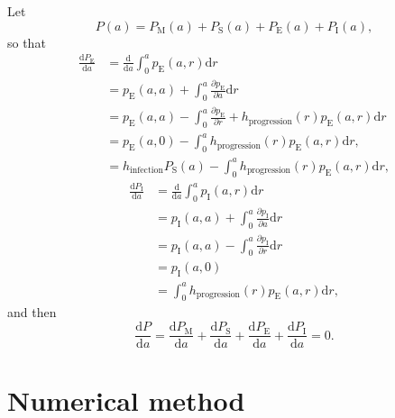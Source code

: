 \documentclass[12pt]{article}
\newcommand{\md}{\mathrm{d}}
\begin{document}
Let
\begin{equation}
  P(a) = P_{\mathrm{M}}(a) + P_{\mathrm{S}}(a)
  + P_{\mathrm{E}}(a) + P_{\mathrm{I}}(a),
\end{equation}
so that
\begin{equation}
  \begin{split}
    \frac{\md P_{\mathrm{E}}}{\md a}
    &= \frac{\md}{\md a}  \int_0^a p_{\mathrm{E}}(a, r) \md r
    \\
    &= p_{\mathrm{E}}(a, a)
    + \int_0^a \frac{\partial p_{\mathrm{E}}}{\partial a} \md r
    \\
    &= p_{\mathrm{E}}(a, a)
    - \int_0^a \frac{\partial p_{\mathrm{E}}}{\partial r}
    + h_{\mathrm{progression}}(r) p_{\mathrm{E}}(a, r) \md r
    \\
    &= p_{\mathrm{E}}(a, 0)
    - \int_0^a h_{\mathrm{progression}}(r) p_{\mathrm{E}}(a, r) \md r,
    \\
    &= h_{\mathrm{infection}} P_{\mathrm{S}}(a)
    - \int_0^a h_{\mathrm{progression}}(r) p_{\mathrm{E}}(a, r) \md r,
  \end{split}
\end{equation}
\begin{equation}
  \begin{split}
    \frac{\md P_{\mathrm{I}}}{\md a}
    &= \frac{\md}{\md a}  \int_0^a p_{\mathrm{I}}(a, r) \md r
    \\
    &= p_{\mathrm{I}}(a, a)
    + \int_0^a \frac{\partial p_{\mathrm{I}}}{\partial a} \md r
    \\
    &= p_{\mathrm{I}}(a, a)
    - \int_0^a \frac{\partial p_{\mathrm{I}}}{\partial r} \md r
    \\
    &= p_{\mathrm{I}}(a, 0)
    \\
    &= \int_0^a h_{\mathrm{progression}}(r) p_{\mathrm{E}}(a, r) \md r,
  \end{split}
\end{equation}
and then
\begin{equation}
  \frac{\md P}{\md a} =
  \frac{\md P_{\mathrm{M}}}{\md a}
  + \frac{\md P_{\mathrm{S}}}{\md a}
  + \frac{\md P_{\mathrm{E}}}{\md a}
  + \frac{\md P_{\mathrm{I}}}{\md a}
  = 0.
\end{equation}


\section{Numerical method}
\end{document}
